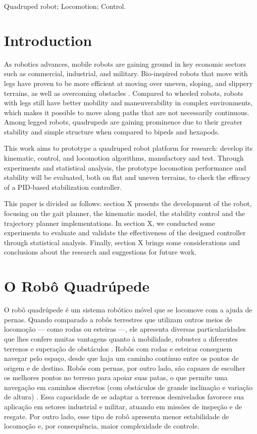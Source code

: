 \documentclass[conference]{IEEEtran}
\begin{document}
\begin{IEEEkeywords}
Quadruped robot; Locomotion; Control.
\end{IEEEkeywords}

\section{Introduction}

As robotics advances, mobile robots are gaining ground in key economic sectors such as commercial, industrial, and military. Bio-inspired robots that move with legs have proven to be more efficient at moving over uneven, sloping, and slippery terrains, as well as overcoming obstacles \cite{X.134}. Compared to wheeled robots, robots with legs still have better mobility and maneuverability in complex environments, which makes it possible to move along paths that are not necessarily continuous. Among legged robots, quadrupeds are gaining prominence due to their greater stability and simple structure when compared to bipeds and hexapods.

This work aims to prototype a quadruped robot platform for research: develop its kinematic, control, and locomotion algorithms, manufactory and test. Through experiments and statistical analysis, the prototype locomotion performance and stability will be evaluated, both on flat and uneven terrains, to check the efficacy of a PID-based stabilization controller.

This paper is divided as follows: section X presents the development of the robot, focusing on the gait planner, the kinematic model, the stability control and the trajectory planner implementations. In section X, we conducted some experiments to evaluate and validate the effectiveness of the designed controller through statistical analysis. Finally, section X brings some considerations and conclusions about the research and suggestions for future work.

\section{O Robô Quadrúpede}

O robô quadrúpede é um sistema robótico móvel que se locomove com a ajuda de pernas. Quando comparado a robôs terrestres que utilizam outros meios de locomoção --- como rodas ou esteiras ---, ele apresenta diversas particularidades que lhes confere muitas vantagens quanto à mobilidade, robustez a diferentes terrenos e superação de obstáculos \cite{Biswal2021}. Robôs com rodas e esteiras conseguem navegar pelo espaço, desde que haja um caminho contínuo entre os pontos de origem e de destino. Robôs com pernas, por outro lado, são capazes de escolher os melhores pontos no terreno para apoiar suas patas, o que permite uma navegação em caminhos discretos (com obstáculos de grande inclinação e variação de altura) \cite{Yao2021}. Essa capacidade de se adaptar a terrenos desnivelados favorece sua aplicação em setores  industrial e militar, atuando em missões de inspeção e de resgate. Por outro lado, esse tipo de robô apresenta menor estabilidade de locomoção e, por consequência, maior complexidade de controle.
\end{document}
